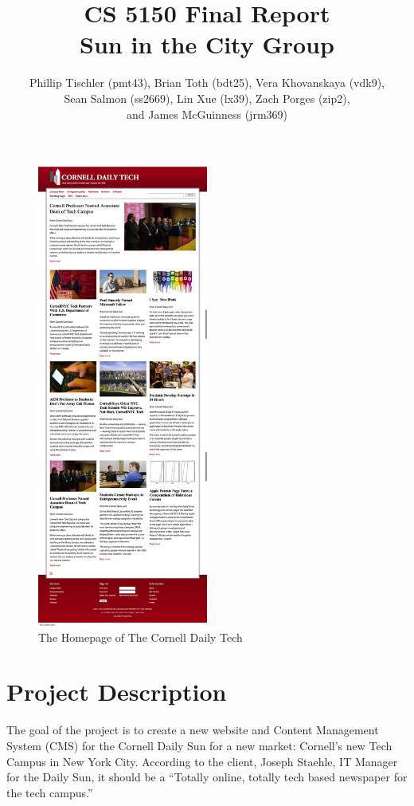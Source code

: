 \documentclass[11pt]{article} %
\title{CS 5150 Final Report \\ Sun in the City Group}
\author{Phillip Tischler (pmt43), Brian Toth (bdt25), Vera Khovanskaya (vdk9), \\ 
Sean Salmon (ss2669), Lin Xue (lx39), Zach Porges (zip2),  \\
and James McGuinness (jrm369)}
\begin{document}
\maketitle


\begin{figure}[h!]
\begin{center}
\includegraphics[height=6in]{images/screen_home}
\end{center}
\caption{The Homepage of The Cornell Daily Tech}
\end{figure}

\clearpage
\tableofcontents
\clearpage

\section{Project Description}

The goal of the project is to create a new website and Content Management System (CMS) for the Cornell Daily Sun for a new market: Cornell’s new Tech Campus in New York City. According to the client, Joseph Staehle, IT Manager for the Daily Sun, it should be a ``Totally online, totally tech based newspaper for the tech campus.”
\end{document}
